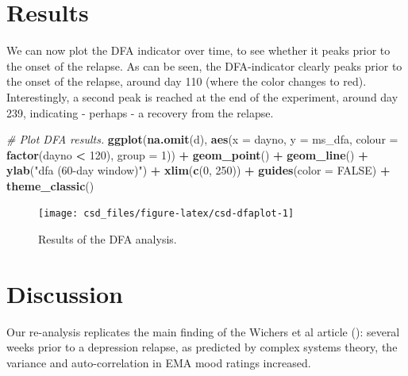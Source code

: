 \documentclass[]{book}
\newenvironment{Shaded}{\begin{snugshade}}{\end{snugshade}}
\newcommand{\KeywordTok}[1]{\textcolor[rgb]{0.13,0.29,0.53}{\textbf{#1}}}
\newcommand{\DataTypeTok}[1]{\textcolor[rgb]{0.13,0.29,0.53}{#1}}
\newcommand{\DecValTok}[1]{\textcolor[rgb]{0.00,0.00,0.81}{#1}}
\newcommand{\StringTok}[1]{\textcolor[rgb]{0.31,0.60,0.02}{#1}}
\newcommand{\CommentTok}[1]{\textcolor[rgb]{0.56,0.35,0.01}{\textit{#1}}}
\newcommand{\OtherTok}[1]{\textcolor[rgb]{0.56,0.35,0.01}{#1}}
\newcommand{\OperatorTok}[1]{\textcolor[rgb]{0.81,0.36,0.00}{\textbf{#1}}}
\newcommand{\NormalTok}[1]{#1}
\begin{document}
\section{Results}\label{results}

We can now plot the DFA indicator over time, to see whether it peaks
prior to the onset of the relapse. As can be seen, the DFA-indicator
clearly peaks prior to the onset of the relapse, around day 110 (where
the color changes to red). Interestingly, a second peak is reached at
the end of the experiment, around day 239, indicating - perhaps - a
recovery from the relapse.

\begin{Shaded}
\begin{Highlighting}[]
\CommentTok{# Plot DFA results.}
\KeywordTok{ggplot}\NormalTok{(}\KeywordTok{na.omit}\NormalTok{(d),}
      \KeywordTok{aes}\NormalTok{(}\DataTypeTok{x =}\NormalTok{ dayno, }\DataTypeTok{y =}\NormalTok{ ms_dfa, }
          \DataTypeTok{colour =} \KeywordTok{factor}\NormalTok{(dayno }\OperatorTok{<}\StringTok{ }\DecValTok{120}\NormalTok{), }
          \DataTypeTok{group =} \DecValTok{1}\NormalTok{)) }\OperatorTok{+}
\StringTok{  }\KeywordTok{geom_point}\NormalTok{() }\OperatorTok{+}
\StringTok{  }\KeywordTok{geom_line}\NormalTok{() }\OperatorTok{+}\StringTok{ }
\StringTok{  }\KeywordTok{ylab}\NormalTok{(}\StringTok{"dfa (60-day window)"}\NormalTok{) }\OperatorTok{+}\StringTok{ }
\StringTok{  }\KeywordTok{xlim}\NormalTok{(}\KeywordTok{c}\NormalTok{(}\DecValTok{0}\NormalTok{, }\DecValTok{250}\NormalTok{)) }\OperatorTok{+}\StringTok{ }
\StringTok{  }\KeywordTok{guides}\NormalTok{(}\DataTypeTok{color =} \OtherTok{FALSE}\NormalTok{) }\OperatorTok{+}\StringTok{ }
\StringTok{  }\KeywordTok{theme_classic}\NormalTok{()}
\end{Highlighting}
\end{Shaded}

\begin{figure}

{\centering \texttt{[image: csd\_files/figure-latex/csd-dfaplot-1]} 

}

\caption{Results of the DFA analysis.}\label{fig:csd-dfaplot}
\end{figure}

\section{Discussion}\label{discussion-2}

Our re-analysis replicates the main finding of the Wichers et al article
(\citep{Wichers2016}): several weeks prior to a depression relapse, as
predicted by complex systems theory, the variance and auto-correlation
in EMA mood ratings increased.
\end{document}
